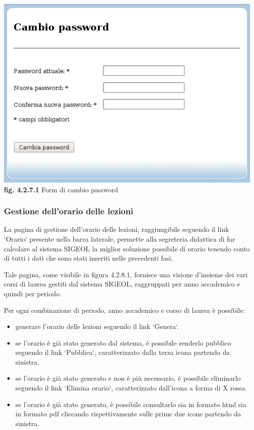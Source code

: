 \documentclass[11pt,a4paper]{article}
\begin{document}
\bigskip
\begin{center}
	\includegraphics[scale=0.5]{images/cambio_password.jpg}\\
	\textbf{fig. 4.2.7.1} Form di cambio password\\
\end{center}
\bigskip

\subsubsection{Gestione dell'orario delle lezioni}
La pagina di gestione dell'orario delle lezioni, raggiungibile seguendo il link `Orario` presente nella barra laterale, permette alla segreteria didattica di far calcolare al sistema SIGEOL la miglior soluzione possibile di orario tenendo conto di tutti i dati che sono stati inseriti nelle precedenti fasi.

Tale pagina, come visibile in figura 4.2.8.1, fornisce una visione d'insieme dei vari corsi di laurea gestiti dal sistema SIGEOL, raggruppati per anno accademico e quindi per periodo.

Per ogni combinazione di periodo, anno accademico e corso di laurea è possibile:
\begin{itemize}
 \item generare l'orario delle lezioni seguendo il link `Genera`.
 \item se l'orario è già stato generato dal sistema, è possibile renderlo pubblico seguendo il link `Pubblica`, caratterizzato dalla terza icona partendo da sinistra. 
 \item se l'orario è già stato generato e non è più necessario, è possibile eliminarlo seguendo il link `Elimina orario`, caratterizzato dall'icona a forma di X rossa.
 \item se l'orario è già stato generato, è possibile consultarlo sia in formato html sia in formato pdf cliccando rispettivamente sulle prime due icone partendo da sinistra.
\end{itemize}
\end{document}
